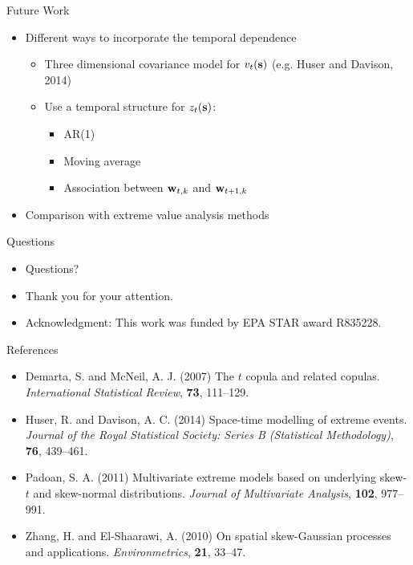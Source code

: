 \documentclass{beamer}
\begin{document}
\begin{frame}{Future Work}
  \begin{itemize} \setlength{\itemsep}{0.5em}
    \item Different ways to incorporate the temporal dependence
    \begin{itemize}
    	\item Three dimensional covariance model for $v_t(\mbox{\bf s})$ (e.g. Huser and Davison, 2014)
    	\item Use a temporal structure for $z_t(\mbox{\bf s})$:
	\begin{itemize}
		\item AR(1)
		\item Moving average 
		\item Association between $\mbox{\bf w}_{t, k}$ and $\mbox{\bf w}_{t+1, k}$
	\end{itemize}
    \end{itemize}
     \item Comparison with extreme value analysis methods
  \end{itemize}
\end{frame}

\begin{frame}{Questions}
  \begin{itemize} \setlength{\itemsep}{0.5em}
    \item Questions?
    \item Thank you for your attention.
    \item Acknowledgment: This work was funded by EPA STAR award R835228.
  \end{itemize}
\end{frame}

\begin{frame}{References}
  \begin{itemize} \setlength{\itemsep}{0.5em}
    \item Demarta, S. and McNeil, A. J. (2007) The $t$ copula and related copulas. {\it International Statistical Review}, {\bf 73}, 111--129.
    \item Huser, R. and Davison, A. C. (2014) Space-time modelling of extreme events. {\it Journal of the Royal Statistical Society: Series B (Statistical Methodology)}, {\bf 76}, 439--461.
    \item Padoan, S. A. (2011) Multivariate extreme models based on underlying skew-$t$ and skew-normal distributions. {\it Journal of Multivariate Analysis}, {\bf 102}, 977--991.
    \item Zhang, H. and El-Shaarawi, A. (2010) On spatial skew-Gaussian processes and applications. {\it Environmetrics}, {\bf 21}, 33--47.
  \end{itemize}
\end{frame}
\end{document}
